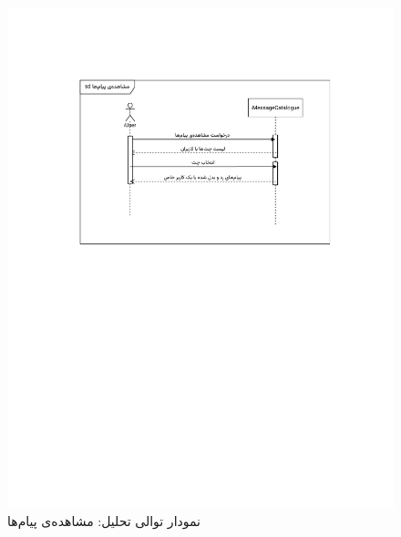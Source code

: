 \begin{figure}[ht!]
	\centering
	\includegraphics[scale=0.8, page=1]{figs/OOD-Sequence-chat.pdf}
	\caption{نمودار توالی تحلیل: مشاهده‌ی پیام‌ها}
\end{figure}
\FloatBarrier
\newpage

